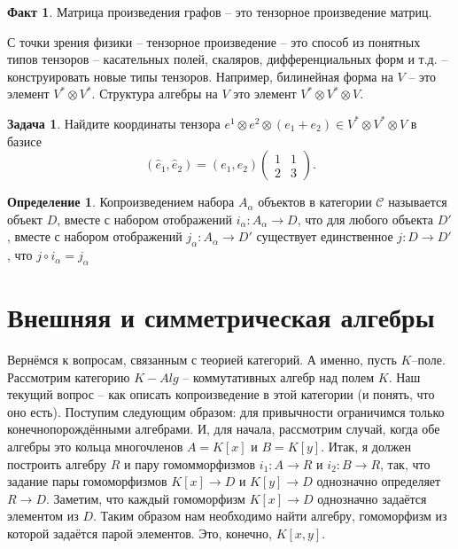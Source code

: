 \documentclass[10pt,a4paper,oneside]{book}
\theoremstyle{definition}
\newtheorem{zad}{Задача}
\newtheorem{defn}{Определение}
\newtheorem*{fact}{Факт}
\newcommand{\mc}[1]{\mathcal{#1}}
\def\dfn{\begin{defn}}
\def\edfn{\end{defn}}
\def\zd{\begin{zad}}
\def\ezd{\end{zad}}
\def\fct{\begin{fact}}
\def\efct{\end{fact}}
\begin{document}
\fct Матрица произведения графов -- это тензорное произведение матриц. \efct

С точки зрения физики -- тензорное произведение -- это способ из понятных типов тензоров -- касательных полей, скаляров, дифференциальных форм и т.д. -- конструировать новые типы тензоров. Например, билинейная форма на $V$ -- это элемент $V^* \otimes V^*$. Структура алгебры на $V$ это элемент $V^*\otimes V^* \otimes V$.



\zd Найдите координаты тензора $e^1\otimes e^2 \otimes(e_1+e_2) \in V^*\otimes V^*\otimes V$ в базисе 
$$(\hat{e}_1, \hat{e}_2) = (e_1,e_2) \begin{pmatrix}1& 1\\
2& 3 \end{pmatrix}.$$
\ezd 

\dfn Копроизведением набора $A_{\alpha}$ объектов в категории $\mc C$ называется объект $D$, вместе с набором отображений $i_{\alpha} \colon A_{\alpha} \to D  $, что для любого объекта $D'$, вместе с набором отображений $j_{\alpha} \colon A_{\alpha} \to D' $ существует единственное $j\colon D \to D'$, что  $j\circ i_{\alpha}=j_{\alpha}$

\begin{center}
\end{center}
\edfn




\section{Внешняя и симметрическая алгебры}

Вернёмся к вопросам, связанным с теорией категорий. А именно, пусть $K$--поле. Рассмотрим категорию $K-Alg$ -- коммутативных алгебр над полем $K$. Наш текущий вопрос -- как описать копроизведение в этой категории (и понять, что оно есть). Поступим следующим образом: для привычности ограничимся только конечнопорождёнными алгебрами. И, для начала, рассмотрим случай, когда обе алгебры это кольца многочленов $A=K[x]$ и $B=K[y]$. Итак, я должен построить алгебру $R$ и пару гомомморфизмов $i_1\colon A \to R$ и $i_2\colon B \to R$, так, что задание пары гомоморфизмов $K[x] \to D$ и $K[y] \to D$ однозначно определяет $R \to D$. Заметим, что каждый гомоморфизм $K[x] \to D$ однозначно задаётся элементом из $D$. Таким образом нам необходимо найти алгебру, гомоморфизм из которой задаётся парой элементов. Это, конечно, $K[x,y]$. 
\end{document}
